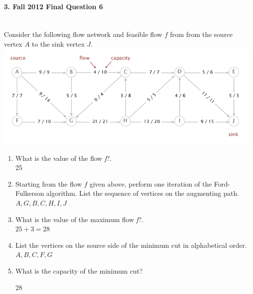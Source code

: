 \documentclass{article}
\begin{document}
\paragraph{\Large 3. Fall 2012 Final Question 6}\mbox{}\\
Consider the following flow network and feasible flow $f$ from from the source vertex $A$ to the sink vertex $J$.\\
\includegraphics[width=\linewidth]{fin-f12-6.png}
\begin{enumerate}
\renewcommand{\theenumi}{\Alph{enumi}}
	\item What is the value of the flow \textit{f}?.\\
	
	25

	\item Starting from the flow $f$ given above, perform one iteration of the Ford-Fulkerson algorithm. List the sequence of vertices on the augmenting path.\\

	$A, G, B, C, H, I, J$

	\item What is the value of the maximum flow \textit{f}?.\\
	
	$25+3=28$

	\item List the vertices on the source side of the minimum cut in alphabetical order.\\

	$A, B, C, F, G$

	\item What is the capacity of the minimum cut?

	28

\end{enumerate}
\end{document}
